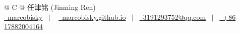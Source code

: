 \documentclass[a4paper,11pt]{article}
\begin{document}
\setlength{\parskip}{0.1\baselineskip}  %

\pagestyle{empty} 


\begin{tabularx}{\linewidth}{@{} C @{}}
\Huge{任津铭 (Jinming Ren)} \\[7.5pt]
\href{https://github.com/marcobisky}{\raisebox{-0.05\height}\faGithub\ marcobisky} \ $|$ \ 
\href{https://marcobisky.github.io}{\raisebox{-0.05\height}\faGlobe \ marcobisky.github.io} \ $|$ \ 
\href{mailto:3191293752@qq.com}{\raisebox{-0.05\height}\faEnvelope \ 3191293752@qq.com} \ $|$ \ 
\href{tel:+86 17882004164}{\raisebox{-0.05\height}\faMobile \ +86 17882004164} \\
\end{tabularx}




\vfill
{}
\end{document}
